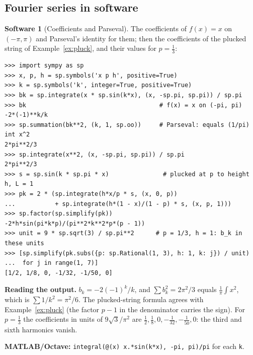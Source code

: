 \documentclass[11pt,a4paper]{article}
\numberwithin{equation}{section}
\theoremstyle{definition}
\newtheorem{software}[thm]{Software}
\begin{document}
\subsection{Fourier series in software}
\label{ssec:software7}

\begin{software}[Coefficients and Parseval]
\label{sw:coeffs}
The coefficients of $f(x) = x$ on $(-\pi, \pi)$ and Parseval's identity for them; then the coefficients of the plucked string of Example~\ref{ex:pluck}, and their values for $p = \frac13$:
{\small\begin{verbatim}
>>> import sympy as sp
>>> x, p, h = sp.symbols('x p h', positive=True)
>>> k = sp.symbols('k', integer=True, positive=True)
>>> bk = sp.integrate(x * sp.sin(k*x), (x, -sp.pi, sp.pi)) / sp.pi
>>> bk                                     # f(x) = x on (-pi, pi)
-2*(-1)**k/k
>>> sp.summation(bk**2, (k, 1, sp.oo))     # Parseval: equals (1/pi) int x^2
2*pi**2/3
>>> sp.integrate(x**2, (x, -sp.pi, sp.pi)) / sp.pi
2*pi**2/3
>>> s = sp.sin(k * sp.pi * x)               # plucked at p to height h, L = 1
>>> pk = 2 * (sp.integrate(h*x/p * s, (x, 0, p))
...           + sp.integrate(h*(1 - x)/(1 - p) * s, (x, p, 1)))
>>> sp.factor(sp.simplify(pk))
-2*h*sin(pi*k*p)/(pi**2*k**2*p*(p - 1))
>>> unit = 9 * sp.sqrt(3) / sp.pi**2      # p = 1/3, h = 1: b_k in these units
>>> [sp.simplify(pk.subs({p: sp.Rational(1, 3), h: 1, k: j}) / unit)
...  for j in range(1, 7)]
[1/2, 1/8, 0, -1/32, -1/50, 0]
\end{verbatim}}
\textbf{Reading the output.} $b_k = -2(-1)^k/k$, and $\sum b_k^2 = 2\pi^2/3$ equals $\frac1\pi\int x^2$, which is $\sum 1/k^2 = \pi^2/6$. The plucked-string formula agrees with Example~\ref{ex:pluck} (the factor $p - 1$ in the denominator carries the sign). For $p = \frac13$ the coefficients in units of $9\sqrt3/\pi^2$ are
$\frac12, \frac18, 0, -\frac1{32}, -\frac1{50}, 0$: the third and sixth harmonics vanish.

\textbf{MATLAB/Octave:} \texttt{integral(@(x) x.*sin(k*x), -pi, pi)/pi} for each \texttt{k}.
\end{software}
\end{document}
